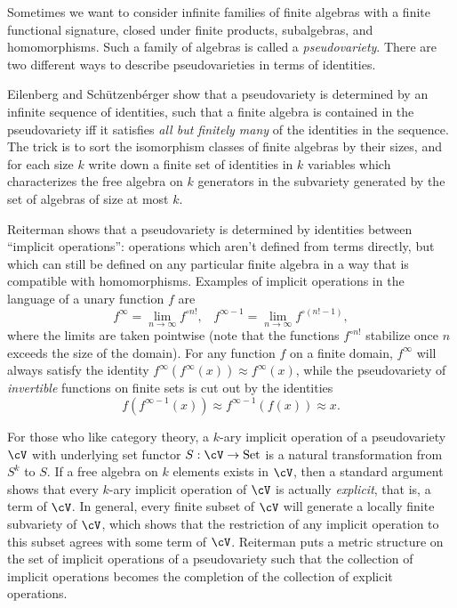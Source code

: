 \begin{rem} Sometimes we want to consider infinite families of finite algebras with a finite functional signature, closed under finite products, subalgebras, and homomorphisms. Such a family of algebras is called a \emph{pseudovariety}. There are two different ways to describe pseudovarieties in terms of identities.

Eilenberg and Sch{\"u}tzenb{\'e}rger \cite{pseudovarieties-ultimate} show that a pseudovariety is determined by an infinite sequence of identities, such that a finite algebra is contained in the pseudovariety iff it satisfies \emph{all but finitely many} of the identities in the sequence. The trick is to sort the isomorphism classes of finite algebras by their sizes, and for each size $k$ write down a finite set of identities in $k$ variables which characterizes the free algebra on $k$ generators in the subvariety generated by the set of algebras of size at most $k$.

Reiterman \cite{pseudovarieties-implicit} shows that a pseudovariety is determined by identities between ``implicit operations'': operations which aren't defined from terms directly, but which can still be defined on any particular finite algebra in a way that is compatible with homomorphisms. Examples of implicit operations in the language of a unary function $f$ are
\[
f^\infty = \lim_{n \rightarrow \infty} f^{\circ n!}, \;\;\; f^{\infty-1} = \lim_{n \rightarrow \infty} f^{\circ (n!-1)},
\]
where the limits are taken pointwise (note that the functions $f^{\circ n!}$ stabilize once $n$ exceeds the size of the domain). For any function $f$ on a finite domain, $f^\infty$ will always satisfy the identity $f^\infty(f^\infty(x)) \approx f^\infty(x)$, while the pseudovariety of \emph{invertible} functions on finite sets is cut out by the identities
\[
f(f^{\infty-1}(x)) \approx f^{\infty-1}(f(x)) \approx x.
\]

For those who like category theory, a $k$-ary implicit operation of a pseudovariety $\cV$ with underlying set functor $S : \cV \rightarrow \text{Set}$ is a natural transformation from $S^k$ to $S$. If a free algebra on $k$ elements exists in $\cV$, then a standard argument shows that every $k$-ary implicit operation of $\cV$ is actually \emph{explicit}, that is, a term of $\cV$. In general, every finite subset of $\cV$ will generate a locally finite subvariety of $\cV$, which shows that the restriction of any implicit operation to this subset agrees with some term of $\cV$. Reiterman \cite{pseudovarieties-implicit} puts a metric structure on the set of implicit operations of a pseudovariety such that the collection of implicit operations becomes the completion of the collection of explicit operations.
\end{rem}


